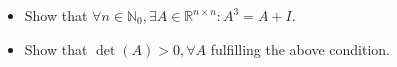 \begin{itemize}
\item[(a)] Show that \(\forall n \in \mathbb{N}_0, \exists A \in \mathbb{R}^{n\times n}: A^3=A+I\).
\item[(b)] Show that \(\det(A)>0, \forall A\) fulfilling the above condition.
\end{itemize}
